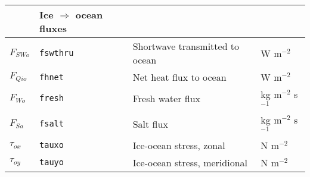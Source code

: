 \begin{table}
\begin{center}
\begin{tabular}{llll}
                        & Ice $\Rightarrow$ ocean fluxes           &  \\  \hline
         $F_{SWo}$      & {\tt fswthru} &  Shortwave transmitted to ocean       &  W m$^{-2}$    \\
         $F_{Qio}$      & {\tt fhnet}   &  Net heat flux to ocean               &  W m$^{-2}$    \\
         $F_{Wo}$       & {\tt fresh}   &  Fresh water flux                     &  kg m$^{-2}$ s$^{-1}$    \\
         $F_{Sa}$       & {\tt fsalt}   &  Salt flux                            &  kg m$^{-2}$ s$^{-1}$    \\
         $\tau_{ox}$    & {\tt tauxo}   &  Ice-ocean stress, zonal              &  N m$^{-2}$    \\
         $\tau_{oy}$    & {\tt tauyo}   &  Ice-ocean stress, meridional         &  N m$^{-2}$    \\  \hline
  \end{tabular}
  \end{center}
\end{table}

